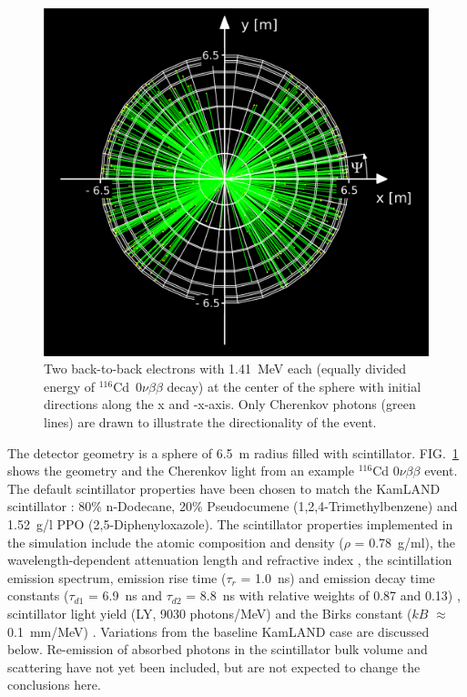 \documentclass[aps,prc,twocolumn,groupedaddress,showpacs,amsmath,amssymb,floatfix,superscriptaddress]{revtex4}
\begin{document}
\begin{figure}
        \begin{center}
        \includegraphics[scale=0.4]{graphs/geometry_plot_labels.pdf}
        \caption[]{Two back-to-back electrons with 1.41~MeV each
        (equally divided energy of $^{116}$Cd~$0\nu\beta\beta$ decay) at
        the center of the sphere with initial directions along the x
        and -x-axis. Only Cherenkov photons (green lines) are drawn to illustrate the
        directionality of the event. \label{detector_view}}
        \end{center}
\end{figure}

The detector geometry is a sphere of 6.5~m radius filled with
scintillator. FIG.~\ref{detector_view} shows the geometry and the
Cherenkov light from an example $^{116}$Cd $0\nu\beta\beta$ event. The
default scintillator properties have been chosen to match the KamLAND
scintillator \cite{kamland2003}: 80\% n-Dodecane, 20\% Pseudocumene
(1,2,4-Trimethylbenzene) and 1.52~g/l PPO (2,5-Diphenyloxazole). The
scintillator properties implemented in the simulation include the
atomic composition and density ($\rho$ = 0.78~g/ml), the
wavelength-dependent attenuation length \cite{tajimaMaster} and
refractive index \cite{OlegThesis}, the scintillation emission
spectrum\cite{tajimaMaster}, emission rise time ($\tau_r$ = 1.0~ns)
and emission decay time constants ($\tau_{d1}$ = 6.9~ns and
$\tau_{d2}$ = 8.8~ns with relative weights of 0.87 and 0.13)
\cite{tajimaThesis}, scintillator light yield (LY, 9030 photons/MeV)
and the Birks constant ($kB$ $\approx$ 0.1~mm/MeV)
\cite{ChrisThesis}. Variations from the baseline KamLAND case are
discussed below. Re-emission of absorbed photons in the scintillator
bulk volume and scattering have not yet been included, but are not
expected to change the conclusions here.
\end{document}
